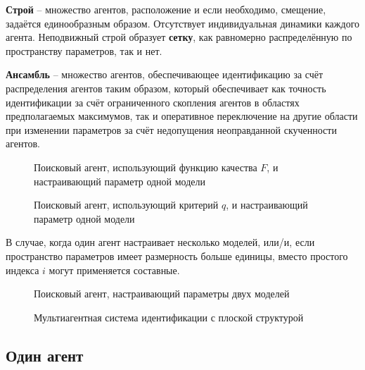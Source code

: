 \textbf{ Строй } -- множество агентов, расположение
и если необходимо, смещение, задаётся
единообразным образом.
Отсутствует индивидуальная динамики каждого агента.
Неподвижный строй образует \textbf{сетку},
как равномерно распределённую по пространству параметров,
так и нет.

\textbf{ Ансамбль } -- множество агентов, обеспечивающее идентификацию за счёт
распределения агентов таким образом, который обеспечивает как
точность идентификации за счёт ограниченного скопления агентов
в областях предполагаемых максимумов, так и оперативное переключение
на другие области при изменении параметров за счёт недопущения
неоправданной скученности агентов.


\begin{figure}[htb!]
\begin{center}

\end{center}
\caption{Поисковый агент, использующий функцию качества $F$, и настраивающий параметр одной модели}
\label{atu:f:agent1}
\end{figure}


\begin{figure}[htb!]
\begin{center}

\end{center}
\caption{Поисковый агент, использующий критерий $q$, и настраивающий параметр одной модели}
\label{atu:f:agent1q}
\end{figure}


В случае, когда один агент настраивает несколько моделей,
или/и, если пространство параметров имеет размерность больше единицы,
вместо простого индекса $i$ могут применяется составные.

\begin{figure}[htb!]
\begin{center}

\end{center}
\caption{Поисковый агент, настраивающий параметры двух моделей}
\label{atu:f:agent2}
\end{figure}

\begin{figure}[htb!]
\begin{center}

\end{center}
\caption{Мультиагентная система идентификации с плоской структурой}
\label{atu:f:agents}
\end{figure}

\subsection{Один агент}

